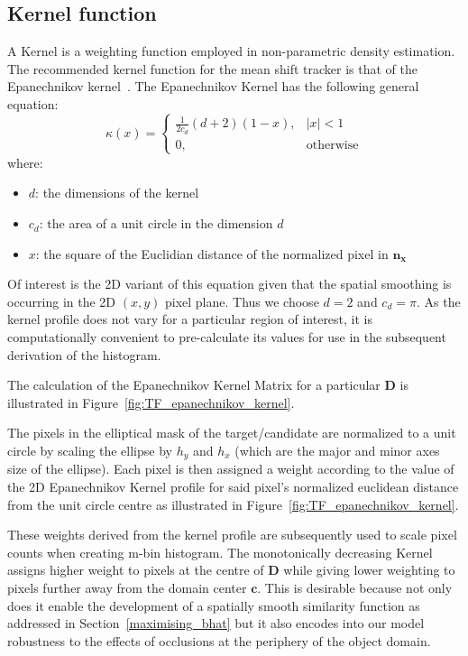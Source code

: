 \subsection{Kernel function}
A Kernel is a weighting function employed in non-parametric density estimation.
The recommended kernel function for the mean shift tracker is that of the
Epanechnikov kernel~\cite{Comaniciu2002}.
The Epanechnikov Kernel has the following general equation:
\begin{equation}
    \kappa(x)=
    \begin{cases}
        \frac{1}{2c_d}(d+2)(1-x), & |x|<1 \\
        0, & \text{otherwise}
    \end{cases}
\end{equation}
where:
\begin{itemize}
   \item $d$: the dimensions of the kernel
   \item $c_d$: the area of a unit circle in the dimension $d$
   \item $x$: the square of the Euclidian distance of the normalized pixel in
       $\mathbf{n_x}$
\end{itemize}

Of interest is the 2D variant of this equation given that the spatial smoothing
is occurring in the 2D $(x,y)$ pixel plane. Thus we choose $d=2$ and $c_d=\pi$.
As the kernel profile does not vary for a particular region of interest, it is
computationally convenient to pre-calculate its values for use in the subsequent
derivation of the histogram.

The calculation of the Epanechnikov Kernel Matrix for a particular $\mathbf{D}$ is
illustrated in Figure~\ref{fig:TF_epanechnikov_kernel}.


The pixels in the elliptical mask of the target/candidate are normalized to a unit
circle by scaling the ellipse by $h_y$ and $h_x$ (which are the major and minor
axes size of the ellipse). Each pixel is then assigned a weight according to the
value of the 2D Epanechnikov Kernel profile for said pixel's normalized euclidean
distance from the unit circle centre as illustrated in Figure~\ref{fig:TF_epanechnikov_kernel}.

These weights derived from the kernel profile are subsequently used to scale
pixel counts when creating m-bin histogram. The monotonically decreasing Kernel
assigns higher weight to pixels at the centre of $\mathbf{D}$ while giving lower
weighting to pixels further away from the domain center $\mathbf{c}$. 
This is desirable because not only does it enable the development of a spatially
smooth similarity function as addressed in Section~\ref{maximising_bhat} but it
also encodes into our model robustness to the effects of occlusions at the
periphery of the object domain.

